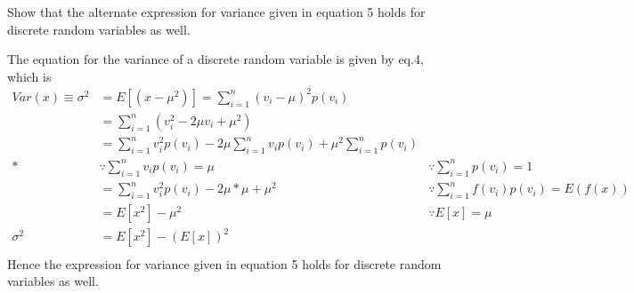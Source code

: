 \begin{Problem}
Show that the alternate expression for variance given in equation 5 holds for discrete random variables as well.
\end{Problem}
\begin{Solution}
The equation for the variance of a discrete random variable is given by eq.4, which is
\begin{align*}
    Var(x) \equiv \sigma^2 &= E[(x-\mu^2)] = \sum_{i=1}^{n}(v_i - \mu)^2p(v_i)\\
    &= \sum_{i=1}^{n} (v_i^2 - 2\mu v_i + \mu^2)\\
    &= \sum_{i=1}^{n} v_i^2 p(v_i) - 2\mu\sum_{i=1}^{n}v_i p(v_i) + \mu^2\sum_{i=1}^{n}p(v_i) \\*&\because \sum_{i=1}^{n}v_i p(v_i) = \mu &\because\sum_{i=1}^{n}p(v_i) = 1\\
    &= \sum_{i=1}^{n} v_i^2 p(v_i) - 2\mu*\mu + \mu^2 &\because \sum_{i=1}^{n}f(v_i)p(v_i) = E(f(x))\\
    &= E[x^2] - \mu^2 &\because E[x] = \mu\\
    \sigma^2&= E[x^2] - (E[x])^2\\
\end{align*}
Hence the expression for variance given in equation 5 holds for discrete random variables as well.
\end{Solution}


